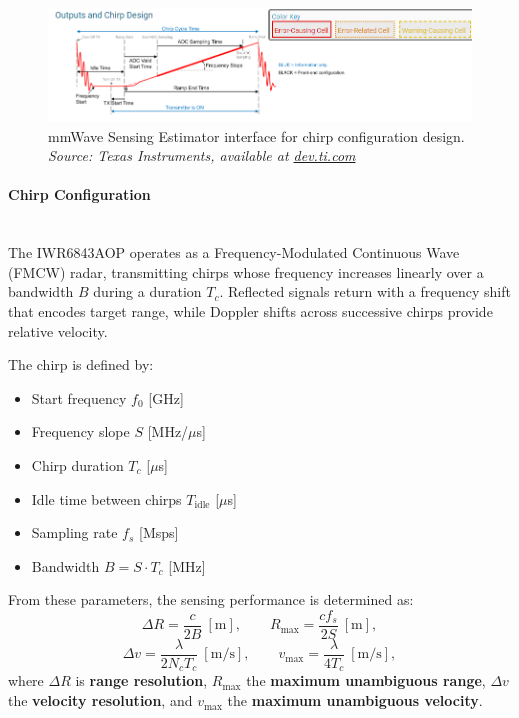 \begin{figure}[!htbp]
    \centering
    \includegraphics[width=0.9\linewidth]{images/sensingEstimatorChirp.png}
    \caption{mmWave Sensing Estimator interface for chirp configuration design.\\
    \textit{Source: Texas Instruments, available at \href{https://dev.ti.com/gallery/view/mmwave/mmWaveSensingEstimator/ver/2.5.1/}{dev.ti.com}}}
    \label{fig:mmwave_sensing_estimator}
\end{figure}

\vspace{0.5em}
\paragraph{Chirp Configuration}
\hfill
\\
\indent The IWR6843AOP operates as a Frequency-Modulated Continuous Wave (FMCW) radar, transmitting chirps whose frequency increases linearly over a bandwidth $B$ during a duration $T_c$.  
Reflected signals return with a frequency shift that encodes target range, while Doppler shifts across successive chirps provide relative velocity.  

The chirp is defined by:
\begin{itemize}
    \item Start frequency $f_0$ [GHz]
    \item Frequency slope $S$ [MHz/$\mu$s]
    \item Chirp duration $T_c$ [$\mu$s]
    \item Idle time between chirps $T_{\text{idle}}$ [$\mu$s]
    \item Sampling rate $f_s$ [Msps]
    \item Bandwidth $B = S \cdot T_c$ [MHz]
\end{itemize}
From these parameters, the sensing performance is determined as:
\[
    \Delta R = \frac{c}{2B} \ [\text{m}], \qquad
    R_{\max} = \frac{c f_s}{2S} \ [\text{m}],
\]
\[
    \Delta v = \frac{\lambda}{2 N_c T_c} \ [\text{m/s}], \qquad
    v_{\max} = \frac{\lambda}{4 T_c} \ [\text{m/s}],
\]
where $\Delta R$ is \textbf{range resolution}, $R_{\max}$ the \textbf{maximum unambiguous range}, $\Delta v$ the \textbf{velocity resolution}, and $v_{\max}$ the \textbf{maximum unambiguous velocity}.  

